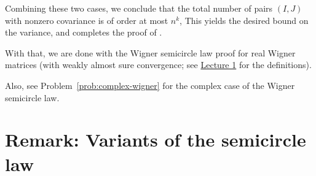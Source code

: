 \documentclass[letterpaper,11pt,oneside,reqno]{article}
\numberwithin{equation}{section}
\theoremstyle{definition}
\begin{document}
Combining these two cases, we conclude that the total number of pairs \((I,J)\) with nonzero covariance is of order at most \(n^k\),
This yields the desired bound on the variance, and completes the proof of .

With that, we are done with the Wigner semicircle law proof for real
Wigner matrices
(with weakly almost sure convergence;
see \href{https://lpetrov.cc/rmt25/rmt25-notes/rmt2025-l01.pdf}{Lecture 1}
for the definitions).

Also, see Problem~\ref{prob:complex-wigner} for the complex case of
the Wigner semicircle law.

\section{Remark: Variants of the semicircle law}
\end{document}
